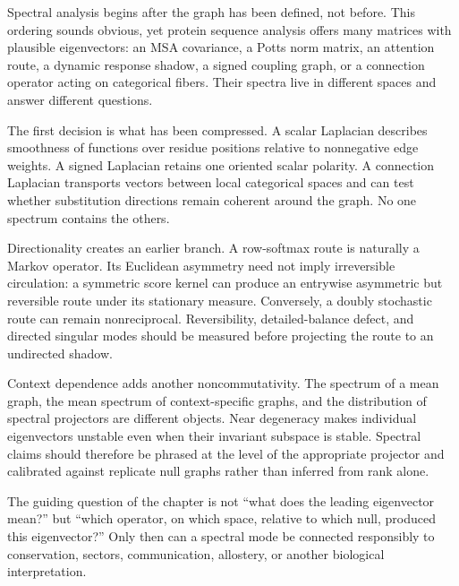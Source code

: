 Spectral analysis begins after the graph has been defined, not before.  This ordering sounds
obvious, yet protein sequence analysis offers many matrices with plausible eigenvectors: an MSA
covariance, a Potts norm matrix, an attention route, a dynamic response shadow, a signed coupling
graph, or a connection operator acting on categorical fibers.  Their spectra live in different
spaces and answer different questions.

The first decision is what has been compressed.  A scalar Laplacian describes smoothness of
functions over residue positions relative to nonnegative edge weights.  A signed Laplacian retains
one oriented scalar polarity.  A connection Laplacian transports vectors between local
categorical spaces and can test whether substitution directions remain coherent around the graph.
No one spectrum contains the others.

Directionality creates an earlier branch.  A row-softmax route is naturally a Markov operator.
Its Euclidean asymmetry need not imply irreversible circulation: a symmetric score kernel can
produce an entrywise asymmetric but reversible route under its stationary measure.  Conversely, a
doubly stochastic route can remain nonreciprocal.  Reversibility, detailed-balance defect, and
directed singular modes should be measured before projecting the route to an undirected shadow.

Context dependence adds another noncommutativity.  The spectrum of a mean graph, the mean spectrum
of context-specific graphs, and the distribution of spectral projectors are different objects.
Near degeneracy makes individual eigenvectors unstable even when their invariant subspace is
stable.  Spectral claims should therefore be phrased at the level of the appropriate projector and
calibrated against replicate null graphs rather than inferred from rank alone.

The guiding question of the chapter is not ``what does the leading eigenvector mean?'' but ``which
operator, on which space, relative to which null, produced this eigenvector?''  Only then can a
spectral mode be connected responsibly to conservation, sectors, communication, allostery, or
another biological interpretation.
